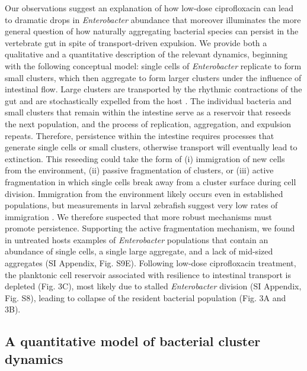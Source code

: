 Our observations suggest an explanation of how low-dose ciprofloxacin can lead to dramatic drops in \textit{Enterobacter} abundance that moreover illuminates the more general question of how naturally aggregating bacterial species can persist in the vertebrate gut in spite of transport-driven expulsion. We provide both a qualitative and a quantitative description of the relevant dynamics, beginning with the following conceptual model: single cells of \textit{Enterobacter}  replicate to form small clusters, which then aggregate to form larger clusters under the influence of intestinal flow. Large clusters are transported by the rhythmic contractions of the gut \cite{Wiles2016,Logan2018,ganz2018} and are stochastically expelled from the host \cite{Wiles2016,Logan2018}. The individual bacteria and small clusters that remain within the intestine serve as a reservoir that reseeds the next population, and the process of replication, aggregation, and expulsion repeats. Therefore, persistence  within the intestine requires processes that generate single cells or small clusters, otherwise transport will eventually lead to extinction. This reseeding could take the form of (i) immigration of new cells from the environment, (ii) passive fragmentation of  clusters, or (iii) active fragmentation in which single cells break away from a cluster surface during cell division. Immigration from the environment likely occurs even in established populations, but measurements in larval zebrafish suggest very low rates of immigration \cite{robinson2018experimental}. We therefore suspected that more robust mechanisms must promote persistence. Supporting the active fragmentation mechanism, we found in untreated hosts examples of \textit{Enterobacter} populations that contain an abundance of single cells, a single large aggregate, and a lack of mid-sized aggregates (SI Appendix, Fig. S9E). Following low-dose ciprofloxacin treatment, the planktonic cell reservoir associated with resilience to intestinal transport is depleted (Fig. 3C), most likely due to stalled \textit{Enterobacter} division (SI Appendix, Fig. S8), leading to collapse of the resident bacterial population (Fig. 3A and 3B).




\subsection*{A quantitative model of bacterial cluster dynamics}


